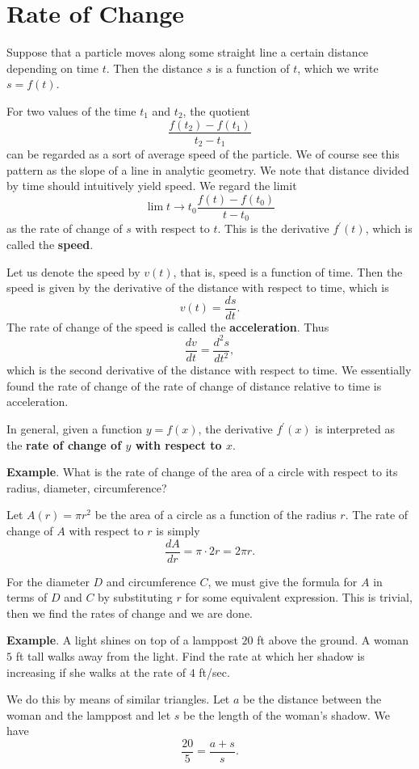 \section*{Rate of Change}

Suppose that a particle moves along some straight line a certain distance depending on time $t$.
Then the distance $s$ is a function of $t$, which we write $s = f(t)$.

For two values of the time $t_1$ and $t_2$, the quotient
\[\frac{f(t_2) - f(t_1)}{t_2 - t_1}\]
can be regarded as a sort of average speed of the particle. We of course see this pattern as the slope of a line
in analytic geometry. We note that distance divided by time should intuitively yield speed. We regard the limit
\[\lim{t\to t_0} \frac{f(t) - f(t_0)}{t - t_0}\]
as the rate of change of $s$ with respect to $t$. This is the derivative $f^\prime(t)$, which is called the
\textbf{speed}.

Let us denote the speed by $v(t)$, that is, speed is a function of time. Then the speed is given by the derivative
of the distance with respect to time, which is
\[v(t) = \frac{ds}{dt}.\]
The rate of change of the speed is called the \textbf{acceleration}. Thus
\[\frac{dv}{dt} = \frac{d^2s}{dt^2},\]
which is the second derivative of the distance with respect to time. We essentially found the rate of change of the
rate of change of distance relative to time is acceleration.

In general, given a function $y = f(x)$, the derivative $f^\prime(x)$ is interpreted as the \textbf{rate of change
  of $y$ with respect to $x$}.

\textbf{Example}. What is the rate of change of the area of a circle with respect to its radius, diameter,
circumference?

Let $A(r) = \pi r^2$ be the area of a circle as a function of the radius $r$. The rate of change of $A$
with respect to $r$ is simply
\[\frac{dA}{dr} = \pi \cdot 2r = 2\pi r.\]

For the diameter $D$ and circumference $C$, we must give the formula for $A$ in terms of $D$ and $C$ by substituting
$r$ for some equivalent expression. This is trivial, then we find the rates of change and we are done.

\textbf{Example}. A light shines on top of a lamppost $20$ ft above the ground. A woman $5$ ft tall walks away
from the light. Find the rate at which her shadow is increasing if she walks at the rate of $4$ ft/sec.

We do this by means of similar triangles. Let $a$ be the distance between the woman and the lamppost and let $s$ be
the length of the woman's shadow. We have
\[\frac{20}{5} = \frac{a + s}{s}.\]
